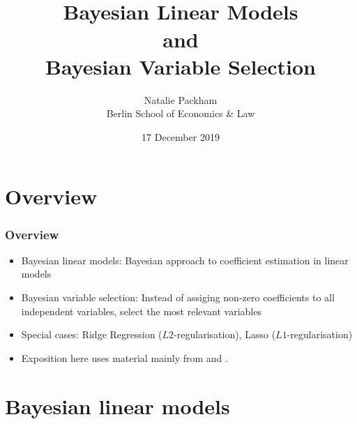 \documentclass[xcolor=table,10pt]{beamer}
\title[BVS, 17 Dec 2019]{\bigskip\\
Bayesian Linear Models\\ and\\ Bayesian Variable Selection\\[3pt] 
}
\author[{\textcopyright} N.\ Packham]{
      Natalie Packham\\
      Berlin  School of Economics \& Law
  }
\institute{\normalsize
 Bayesian Statistics Explorations
}
\date{
17 December 2019
}
\begin{document}
\setcounter{tocdepth}{2}%

\frame{\thispagestyle{empty}\titlepage}

  \logo{}



  
\section{Overview}

\begin{frame}
  \frametitle{Overview}
  \begin{itemize}
  \item \alert{Bayesian linear models}: Bayesian approach to coefficient
    estimation in linear models
  \item \alert{Bayesian variable selection}: Instead of assiging
    non-zero coefficients to all independent variables, \alert{select}
    the most relevant variables
  \item Special cases: \alert{Ridge Regression} ($L2$-regularisation),
    \alert{Lasso} ($L1$-regularisation) 
  \item Exposition here uses material mainly from \citep{Fahrmeir2009}
    and \citep{Koop2003}. 
  \end{itemize}
\end{frame}


\section{Bayesian linear models}
\end{document}
